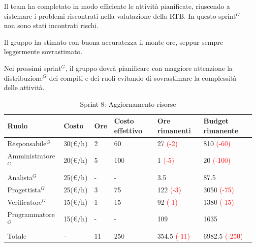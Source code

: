 Il team ha completato in modo efficiente le attività pianificate, riuscendo a sistemare i problemi riscontrati nella valutazione della RTB.
In questo sprint$^G$ non sono stati incontrati rischi.

Il gruppo ha stimato con buona accuratezza il monte ore, seppur sempre leggermente sovrastimato.

Nei prossimi sprint$^G$, il gruppo dovrà pianificare con maggiore attenzione la distribuzione$^G$ dei compiti e dei ruoli evitando di sovrastimare la complessità delle attività.

\begin{table}[H]
	\centering
	\begin{tabular}{|p{}|p{}|p{}|p{}|p{}|p{}|}
		\hline
		\rowcolor{gray!25}
		Ruolo & Costo & Ore & Costo \newline effettivo & Ore \newline rimanenti & Budget \newline rimanente \\ \hline
		
		Responsabile$^G$
		& 30(€/h) & 2 & 60
		& 27 \textcolor{red}{(-2)}
		& 810 \textcolor{red}{(-60)} \\ \hline
		
		Amministratore$^G$
		& 20(€/h) & 5 & 100
		& 1 \textcolor{red}{(-5)}
		& 20 \textcolor{red}{(-100)} \\ \hline
		
		Analista$^G$
		& 25(€/h) & - & -
		& 3.5
		& 87.5 \\ \hline
		
		Progettista$^G$
		& 25(€/h) & 3 & 75
		& 122 \textcolor{red}{(-3)}
		& 3050 \textcolor{red}{(-75)}\\ \hline
		
		Verificatore$^G$
		& 15(€/h) & 1 & 15
		& 92 \textcolor{red}{(-1)}
		& 1380 \textcolor{red}{(-15)} \\ \hline
		
		Programmatore$^G$
		& 15(€/h) & - & -
		& 109
		& 1635 \\ \hline
		
		Totale
		& - & 11 & 250
		& 354.5 \textcolor{red}{(-11)}
		& 6982.5 \textcolor{red}{(-250)} \\ \hline
	\end{tabular}
	\caption{Sprint 8: Aggiornamento risorse}
\end{table}
